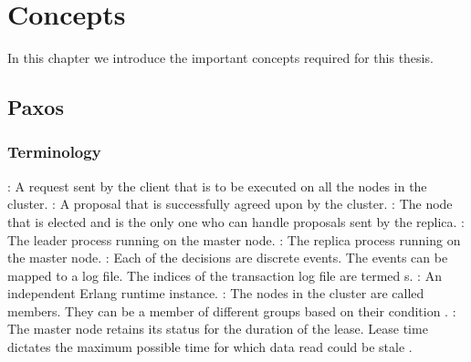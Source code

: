 \chapter{Concepts}
\label{chapter:concepts}

In this chapter we introduce the important concepts required for this thesis.

\section{Paxos}
\label{section:concepts.paxos}

\subsection{Terminology}

\begin{itemize}
    : A request sent by the client that is to be executed on all
    the nodes in the cluster.
    : A proposal that is successfully agreed upon by the
    cluster.
    : The node that is elected and is the only one who can handle
    proposals sent by the replica.
    : The leader process running on the master node.
    : The replica process running on the master node.
    : Each of the decisions are discrete events. The events can be
    mapped to a log file. The indices of the transaction log file are termed
    s.
    : An independent Erlang runtime instance.
    : The nodes in the cluster are called members. They can be
    a member of different groups based on their condition%
    .
    : The master node retains its status for the duration
    of the lease. Lease time dictates the maximum possible time for which data
    read could be stale%
    .
\end{itemize}

